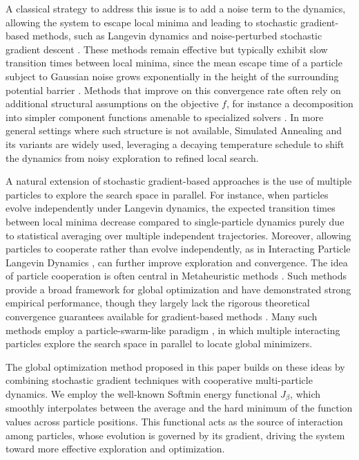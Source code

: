 \documentclass{article}
\theoremstyle{plain}
\theoremstyle{definition}
\theoremstyle{remark}
\begin{document}
A classical strategy to address this issue is to add a noise term to the dynamics, allowing the system to escape local minima and leading to stochastic gradient-based methods, such as Langevin dynamics \cite{CoffeyKalmykovWaldron2004} and noise-perturbed stochastic gradient descent \cite{fehrman2020convergence}. These methods remain effective but typically exhibit slow transition times between local minima, since the mean escape time of a particle subject to Gaussian noise grows exponentially in the height of the surrounding potential barrier \cite{berglund2011kramers}. Methods that improve on this convergence rate often rely on additional structural assumptions on the objective $f$, for instance a decomposition into simpler component functions amenable to specialized solvers \cite{xu2018global}. In more general settings where such structure is not available, Simulated Annealing and its variants \cite{kirkpatrick1983optimization,gelfand1990sampling,tang2024discrete} are widely used, leveraging a decaying temperature schedule to shift the dynamics from noisy exploration to refined local search.

A natural extension of stochastic gradient-based approaches is the use of multiple particles to explore the search space in parallel. For instance, when particles evolve independently under Langevin dynamics, the expected transition times between local minima decrease compared to single-particle dynamics purely due to statistical averaging over multiple independent trajectories. Moreover, allowing particles to cooperate rather than evolve independently, as in Interacting Particle Langevin Dynamics \cite{akyildiz2025interacting,encinar2025proximal}, can further improve exploration and convergence. The idea of particle cooperation is often central in Metaheuristic methods \cite{bandaru2016metaheuristic,yang2020nature}. Such methods provide a broad framework for global optimization and have demonstrated strong empirical performance, though they largely lack the rigorous theoretical convergence guarantees available for gradient-based methods \cite{hussain2019metaheuristic,rajwar2023exhaustive}. Many such methods employ a particle-swarm-like paradigm \cite{hussain2019metaheuristic,rajwar2023exhaustive}, in which multiple interacting particles explore the search space in parallel to locate global minimizers.

The global optimization method proposed in this paper builds on these ideas by combining stochastic gradient techniques with cooperative multi-particle dynamics. We employ the well-known Softmin energy functional $J_\beta$, which smoothly interpolates between the average and the hard minimum of the function values across particle positions. This functional acts as the source of interaction among particles, whose evolution is governed by its gradient, driving the system toward more effective exploration and optimization.
\end{document}
